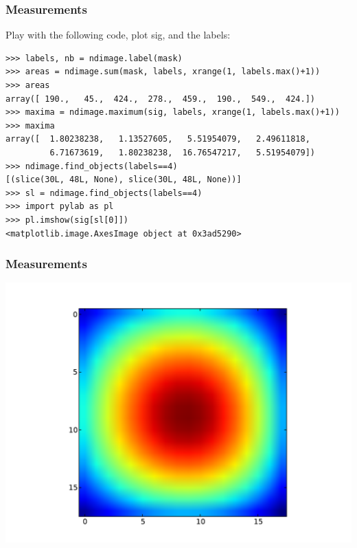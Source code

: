 \documentclass[10pt,colorlinks]{beamer}
\begin{document}
\begin{frame}[fragile]\frametitle{Measurements}
Play with the following code, plot sig, and the labels:
\begin{verbatim}
>>> labels, nb = ndimage.label(mask)
>>> areas = ndimage.sum(mask, labels, xrange(1, labels.max()+1))
>>> areas
array([ 190.,   45.,  424.,  278.,  459.,  190.,  549.,  424.])
>>> maxima = ndimage.maximum(sig, labels, xrange(1, labels.max()+1))
>>> maxima
array([  1.80238238,   1.13527605,   5.51954079,   2.49611818,
         6.71673619,   1.80238238,  16.76547217,   5.51954079])
>>> ndimage.find_objects(labels==4)
[(slice(30L, 48L, None), slice(30L, 48L, None))]
>>> sl = ndimage.find_objects(labels==4)
>>> import pylab as pl
>>> pl.imshow(sig[sl[0]]) 
<matplotlib.image.AxesImage object at 0x3ad5290>
\end{verbatim}

\end{frame}
\begin{frame}[fragile]\frametitle{Measurements}
\includegraphics[width=\textwidth]{plwfigis/CursP_3_figure72}

\end{frame}
\end{document}
